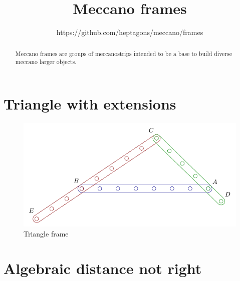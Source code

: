 \documentclass[11pt]{article}
\title{\textbf{Meccano frames}}
\author{https://github.com/heptagons/meccano/frames}
\date{}
\begin{document}
\maketitle
\begin{abstract}
Meccano frames are groups of meccano\meccanoref strips intended to be a
base to build diverse meccano larger objects.
\end{abstract}

\section{Triangle with extensions}

\begin{figure}[h]
\centering
\includegraphics[scale=0.75]{frame_triangle}
\caption{Triangle frame}
\label{fig:triangle}
\end{figure}



\section{Algebraic distance not right}
\end{document}
